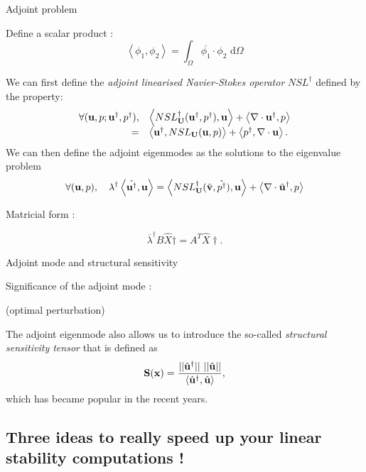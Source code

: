 \documentclass{beamer}
\newcommand{\be}[1]{ \begin{equation} \label{#1}}
\newcommand{\ee}{\end{equation}}
\newcommand{\bes}[1]{ \begin{equation} \label{#1}\begin{array}{rl}}
\newcommand{\ees}{\end{array}\end{equation}}
\newcommand{\ssp}{\vspace{.2cm} }
\begin{document}
\begin{frame}{Adjoint problem}

\small

Define a scalar product :
$$
\left< \phi_1, \phi_2 \right> = \int_\Omega \overline{\phi_1} \cdot \phi_2   \mbox{ d} \Omega
$$


We can first define the {\em adjoint linearised Navier-Stokes operator} $NSL^\dag$ defined by the property:
\bes{NSLAdj}
\forall ( {\bf u}, p ; {\bf u}^\dag, p^\dag), & \left< NSL^\dag_{\bf U}( {\bf u}^\dag,p^\dag) ,{\bf u}\right> + \left< \nabla \cdot {\bf u}^\dag,p\right>  \\
=& \left<{\bf u}^\dag, NSL_{\bf U} ({\bf u},p)\right> + \left< p^\dag, \nabla \cdot {\bf u}\right>.
\ees
We can then define the adjoint eigenmodes as the solutions to the eigenvalue problem 
\be{EigenAdj} 
\forall ( {\bf u}, p), \quad  \lambda^\dag \left< \hat{{\bf u}^\dag}, {\bf u}\right> =
 \left< NSL^\dag_{\bf U}( \hat{\bf v},\hat{p^\dag}) ,{\bf u}\right> + \left< \nabla \cdot \hat{\bf u}^\dag,p\right>  
\ee

Matricial form :

\be{Eigen_Adj_matricial}
\overline{\lambda}^\dag B \hat{X}\dag = A^T \hat{X}\dag.
\ee


\end{frame}

\begin{frame}{Adjoint mode and structural sensitivity}


Significance of the adjoint mode : 

(optimal perturbation)

\ssp



The adjoint eigenmode also allows us to introduce the so-called {\em structural sensitivity tensor } that is defined as 
\be{Structursens} 
{\bf{S}}({\bf{x}}) = \frac{|| \hat{\bf u}^\dag|| \,\, ||\hat{\bf u}|| }{{\left<\hat{\bf u}^\dag, \hat{\bf u}\right>}},
\ee 
which has became popular in the recent years.



\end{frame}

\subsection{Three ideas to really speed up your linear stability computations !}
\end{document}
